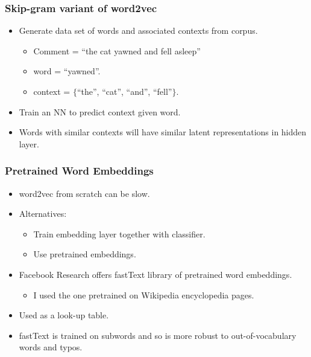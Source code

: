 \documentclass{beamer}
\begin{document}
\begin{frame}
\frametitle{Skip-gram variant of word2vec}
\begin{itemize}
\item Generate data set of words and associated contexts from corpus.
\begin{itemize}
\item Comment = ``the cat yawned and fell asleep''
\item word = ``yawned''.
\item context = $\{$``the'', ``cat'', ``and'', ``fell''$\}$.
\end{itemize}
\item Train an NN to predict context given word.
\item Words with similar contexts will have similar latent representations in hidden layer.
\end{itemize}
\end{frame}

\begin{frame}
\frametitle{Pretrained Word Embeddings}
\begin{itemize}
\item word2vec from scratch can be slow.
\item Alternatives:
\begin{itemize}
\item Train embedding layer together with classifier.
\item Use pretrained embeddings.
\end{itemize}
\item Facebook Research offers fastText library of pretrained word embeddings.
\begin{itemize}
\item I used the one pretrained on Wikipedia encyclopedia pages.
\end{itemize}
\item Used as a look-up table.
\item fastText is trained on subwords and so is more robust to out-of-vocabulary words and typos.
\end{itemize}
\end{frame}
\end{document}
